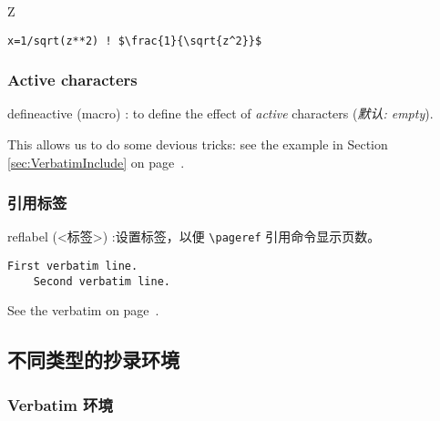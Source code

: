 \documentclass[twoside]{article}
\providecommand\optname[1]{\textsf{#1}}
\newenvironment{optlist}{\begin{description}%
  \renewcommand\makelabel[1]{%
    \descriptionlabel{\mdseries\optname{##1}}}%
  \itemsep0.25\itemsep}%
 {\end{description}}
\newcommand\verbatimTxt{抄录}
\begin{document}
{
\begin{SideBySideExample}
  Z
  \begin{Verbatim}[commandchars=\\\{\},
         codes={\catcode`$=3\catcode`^=7}]
    x=1/sqrt(z**2) ! $\frac{1}{\sqrt{z^2}}$
  \end{Verbatim}
\end{SideBySideExample}
}  %


\subsubsection{Active characters}

\begin{optlist}
  \item[defineactive (macro)]: to define the effect of \emph{active}
  characters
  (\emph{默认: empty}).
\end{optlist}

  This allows us to do some devious tricks: see the example in Section
\ref{sec:VerbatimInclude} on page~\pageref{sec:VerbatimInclude}.


\subsubsection{引用标签}

\begin{optlist}
  \item[reflabel (<标签>)]:设置标签，以便 \verb|\pageref| 引用命令显示页数。
\end{optlist}

\begin{SideBySideExample}
  \begin{Verbatim}[reflabel=verb0]
    First verbatim line.
    Second verbatim line.
  \end{Verbatim}
  See the verbatim on 
  page~\pageref{verb0}.
\end{SideBySideExample}




\subsection{不同类型的{\verbatimTxt}环境}

\subsubsection{Verbatim 环境}
\end{document}
